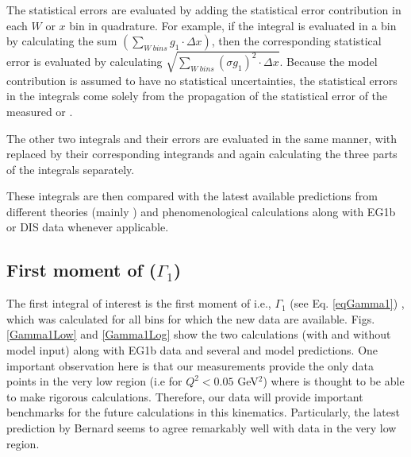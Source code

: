 The statistical errors are evaluated by adding the statistical error contribution in each $W$ or $x$ bin in quadrature. For example, if the integral is evaluated in a \qsqs bin by calculating the sum $\left( \sum\limits_{W ~bins} g_1 \cdot \Delta x \right) $, then the corresponding statistical error is evaluated by calculating %
$\sqrt{ \sum\limits_{W ~bins} (\sigma g_1)^2 \cdot \Delta x  }$. %
Because the model contribution is assumed to have no statistical uncertainties, the statistical errors in the integrals come solely from the propagation of the statistical error of the measured \gones or \afone.

The other two integrals and their errors are evaluated in the same manner, with \gones replaced by their corresponding integrands and again calculating the three parts of the integrals separately. 

 These integrals are then compared with the latest available predictions from different theories (mainly \chipt) and phenomenological calculations along with EG1b or DIS data whenever applicable.


\subsection{First moment of \gones ($\Gamma_1$)}
The first integral of interest is %
the first moment of \gones i.e., $\Gamma_1$ (see Eq. \ref{eqGamma1}) , which was calculated for all %
\qsqs bins for which the new data are %
available. Figs. \ref{Gamma1Low} and \ref{Gamma1Log} show the two calculations (with and without model input) along with EG1b data and several \chipts and model predictions. One important observation here is that our measurements provide the only data points in %
the very low \qsqs region (i.e for $Q^2<0.05$ GeV$^2$) where \chipts is thought to be able to make %
rigorous calculations. Therefore, our data will provide important benchmarks for the future calculations in this kinematics. Particularly, the latest \chipts prediction by Bernard \etal \cite{BEKM13} seems to agree remarkably well with data in %
the very low \qsqs region.

